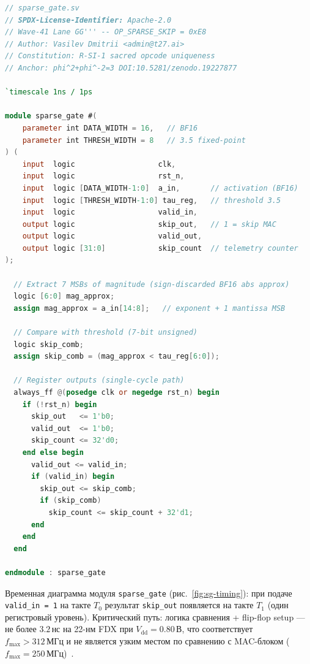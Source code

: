\begin{lstlisting}[language=Verilog,
  caption={sparse\_gate.sv — однотактный вентиль разреженной
    активации (\texttt{OP\_SPARSE\_SKIP = 0xE8})},
  label={lst:sparse-gate-sv}]
// sparse_gate.sv
// SPDX-License-Identifier: Apache-2.0
// Wave-41 Lane GG''' -- OP_SPARSE_SKIP = 0xE8
// Author: Vasilev Dmitrii <admin@t27.ai>
// Constitution: R-SI-1 sacred opcode uniqueness
// Anchor: phi^2+phi^-2=3 DOI:10.5281/zenodo.19227877

`timescale 1ns / 1ps

module sparse_gate #(
    parameter int DATA_WIDTH = 16,   // BF16
    parameter int THRESH_WIDTH = 8   // 3.5 fixed-point
) (
    input  logic                   clk,
    input  logic                   rst_n,
    input  logic [DATA_WIDTH-1:0]  a_in,       // activation (BF16)
    input  logic [THRESH_WIDTH-1:0] tau_reg,   // threshold 3.5
    input  logic                   valid_in,
    output logic                   skip_out,   // 1 = skip MAC
    output logic                   valid_out,
    output logic [31:0]            skip_count  // telemetry counter
);

  // Extract 7 MSBs of magnitude (sign-discarded BF16 abs approx)
  logic [6:0] mag_approx;
  assign mag_approx = a_in[14:8];   // exponent + 1 mantissa MSB

  // Compare with threshold (7-bit unsigned)
  logic skip_comb;
  assign skip_comb = (mag_approx < tau_reg[6:0]);

  // Register outputs (single-cycle path)
  always_ff @(posedge clk or negedge rst_n) begin
    if (!rst_n) begin
      skip_out   <= 1'b0;
      valid_out  <= 1'b0;
      skip_count <= 32'd0;
    end else begin
      valid_out <= valid_in;
      if (valid_in) begin
        skip_out <= skip_comb;
        if (skip_comb)
          skip_count <= skip_count + 32'd1;
      end
    end
  end

endmodule : sparse_gate
\end{lstlisting}

Временная диаграмма модуля \texttt{sparse\_gate} (рис.~\ref{fig:sg-timing}):
при подаче \texttt{valid\_in = 1} на такте $T_0$ результат \texttt{skip\_out}
появляется на такте $T_1$ (один регистровый уровень).
Критический путь: логика сравнения + flip-flop setup — не более $3{.}2\,\text{нс}$
на 22-нм FDX при $V_{\mathrm{dd}} = 0{.}80\,\text{В}$, что соответствует
$f_{\max} > 312\,\text{МГц}$ и не является узким местом по сравнению
с MAC-блоком ($f_{\max} = 250\,\text{МГц}$)~\cite{IRDS2023-MoreMoore}.

